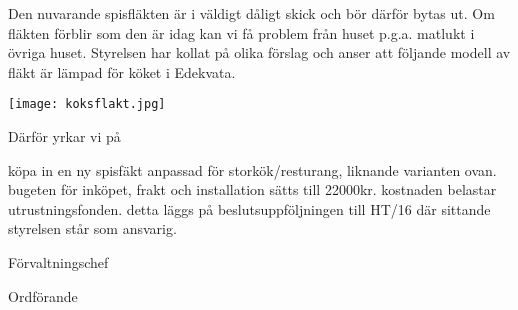 \documentclass[../_main/handlingar.tex]{subfiles}
\begin{document}
Den nuvarande spisfläkten är i väldigt dåligt skick och bör därför bytas ut. Om fläkten förblir som den är idag kan vi få problem från huset p.g.a. matlukt i övriga huset. Styrelsen har kollat på olika förslag och anser att följande modell av fläkt är lämpad för köket i Edekvata.

\begin{center}
   \texttt{[image: koksflakt.jpg]}
\end{center}

Därför yrkar vi på
\begin{attsatser}
    \att köpa in en ny spisfäkt anpassad för storkök/resturang, liknande varianten ovan.
    \att bugeten för inköpet, frakt och installation sätts till 22000kr.
    \att kostnaden belastar utrustningsfonden.
    \att detta läggs på beslutsuppföljningen till HT/16 där sittande styrelsen står som ansvarig.
\end{attsatser}

\begin{signatures}{2}
    \ist
    \signature{Anders Nilsson}{Förvaltningschef}
    \signature{\ordf}{Ordförande}
\end{signatures}
\end{document}
